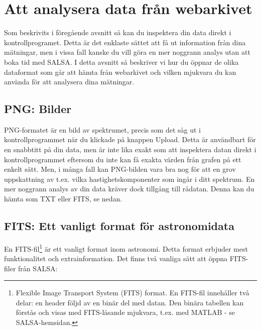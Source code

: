 \section{Att analysera data från webarkivet}
\label{sect:archiveprocess}
Som beskrivits i föregående avsnitt så kan du inspektera din data direkt i
kontrollprogramet. Detta är det enklaste sättet att få ut information
från dina mätningar, men i vissa fall kanske du vill göra en mer noggrann analys
utan att boka tid med SALSA. I detta avsnitt så beskriver vi hur du öppnar
de olika dataformat som går att hämta från webarkivet och vilken mjukvara
du kan använda för att analysera dina mätningar.

\subsection{PNG: Bilder}
PNG-formatet är en bild av spektrumet, precis som det såg ut i kontrollprogrammet
när du klickade på knappen Upload. Detta är användbart för en snabbtitt på din data,
men är inte lika exakt som att inspektera datan direkt i kontrollprogrammet
eftersom du inte kan få exakta värden från grafen på ett enkelt sätt. 
Men, i många fall kan PNG-bilden vara bra nog för att en grov uppskattning
av t.ex. vilka hastighetskomponenter som ingår i ditt spektrum. En mer
noggrann analys av din data kräver dock tillgång till rådatan. Denna 
kan du hämta som TXT eller FITS, se nedan. 


\subsection{FITS: Ett vanligt format för astronomidata}
En FITS-fil\footnote{Flexible Image Transport System (FITS) format.  En FITS-fil
	innehåller två delar: en header följd av en binär del med datan. Den binära
	tabellen kan förstås och visas med FITS-läsande mjukvara, t.ex. med MATLAB - se
	SALSA-hemsidan. } är ett vanligt format inom astronomi. Detta format
	erbjuder mest funktionalitet och extrainformation. Det finns två vanliga sätt att
	öppna FITS-filer från SALSA:

